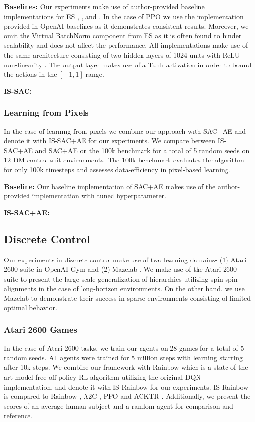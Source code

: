 \documentclass{article}
\begin{document}
\textbf{Baselines:} Our experiments make use of author-provided baseline implementations for ES \cite{es}, \cite{td3}, \cite{sac} and \cite{esac}. In the case of PPO \cite{ppo} we  use the implementation provided in OpenAI baselines \cite{baselines} as it demonstrates consistent results. Moreover, we omit the Virtual BatchNorm \cite{vb} component from ES as it is often found to hinder scalability and does not affect the performance. All implementations make use of the same architecture consisting of two hidden layers of 1024 units with ReLU non-linearity \cite{relu}. The output layer makes use of a Tanh activation in order to bound the actions in the $[-1,1]$ range.

\textbf{IS-SAC:}

\subsubsection{Learning from Pixels}
In the case of learning from pixels we combine our approach with SAC+AE \cite{sacae} and denote it with IS-SAC+AE for our experiments. We compare between IS-SAC+AE and SAC+AE on the 100k benchmark \cite{curl} for a total of 5 random seeds on 12 DM control suit environments. The 100k benchmark evaluates the algorithm for only 100k timesteps and assesses data-efficiency in pixel-based learning. 

\textbf{Baseline:} Our baseline implementation of SAC+AE makes use of the author-provided implementation \cite{sacae} with tuned hyperparameter.  

\textbf{IS-SAC+AE:}

\subsection{Discrete Control}
Our experiments in discrete control make use of two learning domains- (1) Atari 2600 suite in OpenAI Gym \cite{gym} and (2) Mazelab \cite{mazelab}. We make use of the Atari 2600 suite to present the large-scale generalization of hierarchies utilizing spin-spin alignments in the case of long-horizon environments. On the other hand, we use Mazelab to demonstrate their success in sparse environments consisting of limited optimal behavior. 

\subsubsection{Atari 2600 Games}
In the case of Atari 2600 tasks, we train our agents on 28 games for a total of 5 random seeds. All agents were trained for 5 million steps with learning starting after 10k steps. We combine our framework with Rainbow \cite{rainbow} which is a state-of-the-art model-free off-policy RL algorithm utilizing the original DQN \cite{rainbow} implementation. and denote it with IS-Rainbow for our experiments. IS-Rainbow is compared to Rainbow \cite{rainbow}, A2C \cite{a2c}, PPO \cite{ppo} and ACKTR \cite{acktr}. Additionally, we present the scores of an average human subject and a random agent for comparison and reference.
\end{document}
